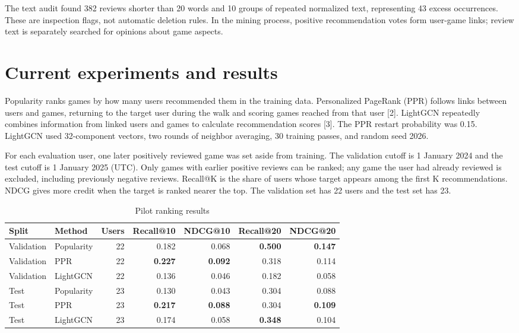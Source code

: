 \documentclass[11pt]{article}
\begin{document}
The text audit found 382 reviews shorter than 20 words and 10 groups of repeated normalized text, representing 43 excess occurrences. These are inspection flags, not automatic deletion rules. In the mining process, positive recommendation votes form user-game links; review text is separately searched for opinions about game aspects.

\section*{Current experiments and results}

Popularity ranks games by how many users recommended them in the training data. Personalized PageRank (PPR) follows links between users and games, returning to the target user during the walk and scoring games reached from that user [2]. LightGCN repeatedly combines information from linked users and games to calculate recommendation scores [3]. The PPR restart probability was 0.15. LightGCN used 32-component vectors, two rounds of neighbor averaging, 30 training passes, and random seed 2026.

For each evaluation user, one later positively reviewed game was set aside from training. The validation cutoff is 1 January 2024 and the test cutoff is 1 January 2025 (UTC). Only games with earlier positive reviews can be ranked; any game the user had already reviewed is excluded, including previously negative reviews. Recall@K is the share of users whose target appears among the first K recommendations. NDCG gives more credit when the target is ranked nearer the top. The validation set has 22 users and the test set has 23.

\begin{table}[ht]
\centering
\small
\caption{Pilot ranking results}
\begin{tabular}{llrrrrr}
\toprule
Split & Method & Users & Recall@10 & NDCG@10 & Recall@20 & NDCG@20 \\
\midrule
Validation & Popularity & 22 & 0.182 & 0.068 & \textbf{0.500} & \textbf{0.147} \\
Validation & PPR & 22 & \textbf{0.227} & \textbf{0.092} & 0.318 & 0.114 \\
Validation & LightGCN & 22 & 0.136 & 0.046 & 0.182 & 0.058 \\
Test & Popularity & 23 & 0.130 & 0.043 & 0.304 & 0.088 \\
Test & PPR & 23 & \textbf{0.217} & \textbf{0.088} & 0.304 & \textbf{0.109} \\
Test & LightGCN & 23 & 0.174 & 0.058 & \textbf{0.348} & 0.104 \\
\bottomrule
\end{tabular}
\end{table}
\end{document}
